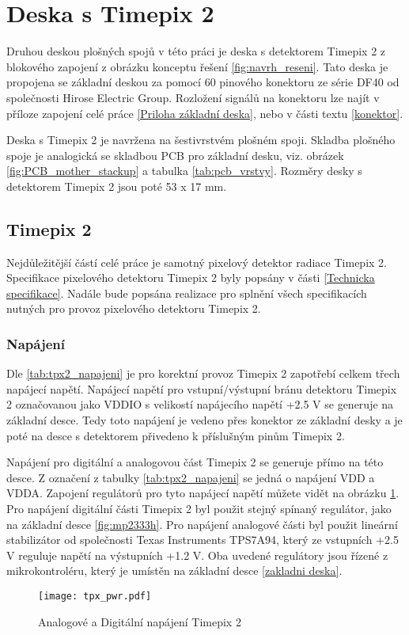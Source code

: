 \section{Deska s Timepix 2}
	\label{Deska s Timepix2}
	Druhou deskou plošných spojů v této práci je deska s detektorem Timepix 2 z blokového zapojení z obrázku konceptu řešení \ref{fig:navrh_reseni}. Tato deska je propojena se základní deskou za pomocí 60 pinového konektoru ze série DF40 od společnosti Hirose Electric Group. Rozložení signálů na konektoru lze najít v příloze zapojení celé práce \ref{Priloha základní deska}, nebo v části textu \ref{konektor}.
	
	\par Deska s Timepix 2 je navržena na šestivrstvém plošném spoji. Skladba plošného spoje je analogická se skladbou PCB pro základní desku, viz. obrázek \ref{fig:PCB_mother_stackup} a tabulka \ref{tab:pcb_vrstvy}. Rozměry desky s detektorem Timepix 2 jsou poté 53 x 17 mm. 
\subsection{Timepix 2}	%
	Nejdůležitější částí celé práce je samotný pixelový detektor radiace Timepix 2. Specifikace pixelového detektoru Timepix 2 byly popsány v části \ref{Technicka specifikace}. Nadále bude popsána realizace pro splnění všech specifikacích nutných pro provoz pixelového detektoru Timepix 2.
	\subsubsection{Napájení}	%
	Dle \ref{tab:tpx2_napajeni} je pro korektní provoz Timepix 2 zapotřebí celkem třech napájecí napětí. Napájecí napětí pro vstupní/výstupní bránu detektoru Timepix 2 označovanou jako VDDIO s velikostí napájecího napětí +2.5 V se generuje na základní desce. Tedy toto napájení je vedeno přes konektor ze základní desky a je poté na desce s detektorem přivedeno k příslušným pinům Timepix 2.
	\par Napájení pro digitální a analogovou část Timepix 2 se generuje přímo na této desce. Z označení z tabulky \ref{tab:tpx2_napajeni} se jedná o napájení VDD a VDDA. Zapojení regulátorů pro tyto napájecí napětí můžete vidět na obrázku \ref{fig:tpx_pwr}. Pro napájení digitální části Timepix 2 byl použit stejný spínaný regulátor, jako na základní desce \ref{fig:mp2333h}. Pro napájení analogové části byl použit lineární stabilizátor od společnosti Texas Instruments TPS7A94, který ze vstupních +2.5 V reguluje napětí na výstupních +1.2 V. Oba uvedené regulátory jsou řízené z mikrokontroléru, který je umístěn na základní desce \ref{zakladni deska}.
	\begin{figure}[h!]
		\centering
		\captionsetup{justification=centering}
		\texttt{[image: tpx\_pwr.pdf]}
		\caption{Analogové a Digitální napájení Timepix 2} 
		\label{fig:tpx_pwr}
	\end{figure} 
